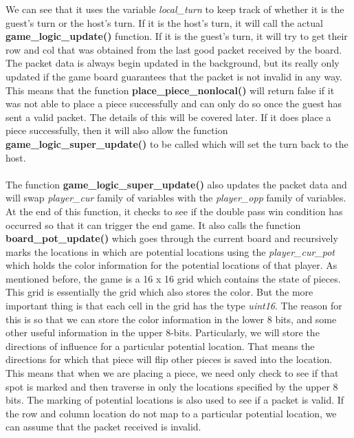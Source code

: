 \documentclass[a4paper, 12pt]{article}
\begin{document}
    We can see that it uses the variable \textit{local\_turn} to keep track of
    whether it is the guest's turn or the host's turn. If it is the host's
    turn, it will call the actual \textbf{game\_logic\_update()} function.
    If it is the guest's turn, it will try to get their row and col that
    was obtained from the last good packet received by the board. The packet
    data is always begin updated in the background, but its really only updated
    if the game board guarantees that the packet is not invalid in any way.
    This means that the function \textbf{place\_piece\_nonlocal()} will return
    false if it was not able to place a piece successfully and can only do so
    once the guest has sent a valid packet. The details of this will be 
    covered later. If it does place a piece successfully, then it will also
    allow the function \textbf{game\_logic\_super\_update()} to be called
    which will set the turn back to the host.
    \\ \\
    The function \textbf{game\_logic\_super\_update()} also updates the packet
    data and will swap \textit{player\_cur} family of variables with the
    \textit{player\_opp} family of variables. At the end of this function,
    it checks to see if the double pass win condition has occurred so that it
    can trigger the end game. It also calls the function 
    \textbf{board\_pot\_update()} which goes through the current board and
    recursively marks the locations in which are potential locations using the
    \textit{player\_cur\_pot} which holds the color information for the
    potential locations of that player. As mentioned before, the game is a 16
    x 16 grid which contains the state of pieces. This grid is essentially the
    grid which also stores the color. But the more important thing is that each cell
    in the grid has the type \textit{uint16}. The reason for this is so that
    we can store the color information in the lower 8 bits, and some other
    useful information in the upper 8-bits. Particularly, we will store the
    directions of influence for a particular potential location. That means the
    directions for which that piece will flip other pieces is saved into the
    location. This means that when we are placing a piece, we need only check
    to see if that spot is marked and then traverse in only the locations
    specified by the upper 8 bits. The marking of potential locations is also
    used to see if a packet is valid. If the row and column location do not 
    map to a particular potential location, we can assume that the packet
    received is invalid.
\end{document}
